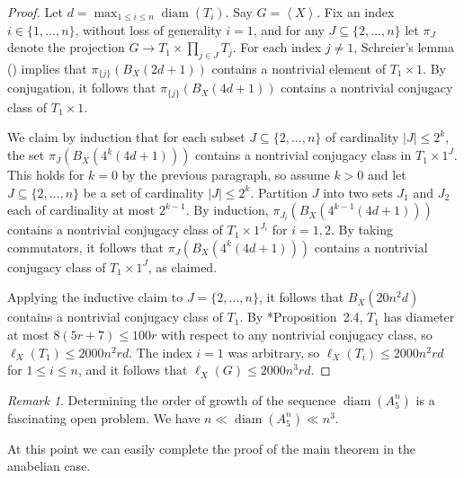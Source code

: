 \documentclass[11pt,reqno]{amsart}
\numberwithin{equation}{section}
\theoremstyle{definition}
\theoremstyle{remark}
\newtheorem{remark}[theorem]{Remark}
\newcommand\opr[1]{\operatorname{#1}}
\def\diam{\opr{diam}}
\def\len{\ell}
\newcommand\gen[1]{\left\langle#1\right\rangle}
\renewcommand{\subset}{\subseteq} %
\numberwithin{equation}{section}
\begin{document}
\begin{proof}
    Let $d = \max_{1 \le i \le n} \diam(T_i)$.
    Say $G = \gen X$. Fix an index $i \in \{1, \dots, n\}$, without loss of generality $i = 1$, and for any $J \subset \{2, \dots, n\}$ let $\pi_J$ denote the projection $G \to T_1 \times \prod_{j \in J} T_j$.
    For each index $j \ne 1$, Schreier's lemma () implies that $\pi_{\{j\}}(B_X(2d+1))$ contains a nontrivial element of $T_1 \times 1$.
    By conjugation, it follows that $\pi_{\{j\}}(B_X(4d+1))$ contains a nontrivial conjugacy class of $T_1 \times 1$.

    We claim by induction that for each subset $J \subset \{2, \dots, n\}$ of cardinality $|J| \le 2^k$, the set $\pi_J(B_X(4^k (4d+1)))$ contains a nontrivial conjugacy class in $T_1 \times 1^J$.
    This holds for $k = 0$ by the previous paragraph, so assume $k > 0$
    and let $J \subseteq \{2, \dots, n\}$ be a set of cardinality $|J| \le 2^k$.
    Partition $J$ into two sets $J_1$ and $J_2$ each of cardinality at most $2^{k-1}$.
    By induction, $\pi_{J_i}(B_X(4^{k-1}(4d+1)))$ contains a nontrivial conjugacy class of $T_1 \times 1^{J_i}$ for $i = 1, 2$.
    By taking commutators, it follows that $\pi_J(B_X(4^k(4d+1)))$ contains a nontrivial conjugacy class of $T_1 \times 1^J$, as claimed.

    Applying the inductive claim to $J = \{2, \dots, n\}$, it follows that $B_X(20 n^2 d)$ contains a nontrivial conjugacy class of $T_1$.
    By \cite{dona-direct-products}*{Proposition~2.4}, $T_1$ has diameter at most $8(5r+7) \le 100r$ with respect to any nontrivial conjugacy class, so $\len_X(T_1) \le 2000 n^2 r d$.
    The index $i = 1$ was arbitrary, so $\len_X(T_i) \le 2000 n^2 r d$ for $1 \le i \le n$, and it follows that $\len_X(G) \le 2000 n^3 r d$.
\end{proof}

\begin{remark}
    Determining the order of growth of the sequence $\diam(A_5^n)$ is a fascinating open problem.
    We have $n \ll \diam(A_5^n) \ll n^3$.
\end{remark}

At this point we can easily complete the proof of the main theorem in the anabelian case.
\end{document}
